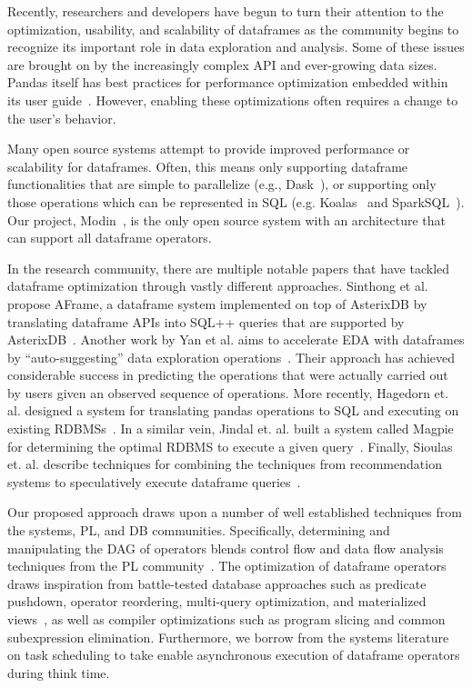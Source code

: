Recently, researchers and developers have begun to turn their attention to the optimization, 
usability, and scalability of dataframes as the community begins to recognize its important role in data exploration and analysis. 
Some of these issues are brought on by the increasingly complex API and ever-growing data sizes. 
Pandas itself has best practices for performance optimization embedded within
its user guide~\cite{pandas-opt}. However, enabling these optimizations often requires a change to the user's behavior.

Many open source systems attempt to provide improved performance or scalability for dataframes. Often, this means only supporting
dataframe functionalities that are simple to parallelize (e.g., Dask~\cite{Dask}),
or supporting only those operations which can be represented in SQL 
(e.g. Koalas~\cite{koalas} and SparkSQL~\cite{sparksql-func}). Our project, Modin~\cite{Modin}, is the only open source
system with an architecture that can support all dataframe operators.



In the research community, there are multiple notable papers that have tackled dataframe optimization through vastly different approaches. Sinthong et al. propose AFrame, a dataframe system implemented on top of AsterixDB by translating dataframe APIs into SQL++ queries that are supported by AsterixDB~\cite{sinthong2019aframe}. 
Another work by Yan et al. aims to accelerate EDA with dataframes by ``auto-suggesting'' data exploration operations~\cite{yan2020auto}. 
Their approach has achieved considerable success in predicting the operations that were actually carried out by users given an observed sequence of operations. More recently, Hagedorn et. al. designed a system for translating pandas operations to SQL and executing on existing RDBMSs~\cite{hagedornputting}. In a similar vein, Jindal et. al. built a system called Magpie for determining the optimal RDBMS to execute a given query~\cite{jindalmagpie}. Finally, Sioulas et. al. describe techniques for combining the techniques from recommendation systems to speculatively execute dataframe queries~\cite{sioulasaccelerating}. 

Our proposed approach draws upon a number of well established techniques from the systems, PL, and DB communities. Specifically, determining and manipulating the DAG of operators blends control flow and data flow analysis techniques from the PL community~\cite{cooper2011engineering}. 
The optimization of dataframe operators draws inspiration from battle-tested database approaches such as predicate pushdown, operator reordering, multi-query optimization, and materialized views~\cite{hellerstein2007architecture}, as well as compiler optimizations such as program slicing and common subexpression elimination. Furthermore, we borrow from the systems literature on task scheduling to take enable asynchronous execution of dataframe operators during think time.
